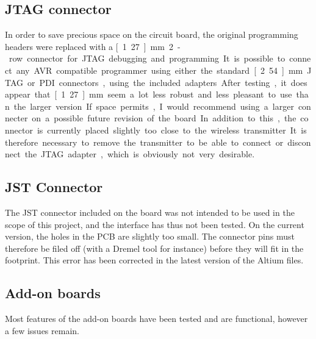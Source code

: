 \subsection{JTAG connector}
In order to save precious space on the circuit board, the original programming
headers were replaced with a \unit[1.27]{mm} 2-row connector for JTAG debugging
and programming. It is possible to connect any AVR compatible programmer using
either the standard \unit[2.54]{mm} JTAG or PDI connectors, using the included
adapters.

After testing, it does appear that \unit[1.27]{mm} seem a lot less robust and
less pleasant to use than the larger version. If space permits, I would
recommend using a larger connecter on a possible future revision of the board.

In addition to this, the connector is currently placed slightly too close to the
wireless transmitter. It is therefore necessary to remove the transmitter to be
able to connect or disconnect the JTAG adapter, which is obviously not very
desirable.

\subsection{JST Connector}
The JST connector included on the board was not intended to be used in the scope
of this project, and the interface has thus not been tested. On the current
version, the holes in the PCB are slightly too small. The connector pins must
therefore be filed off (with a Dremel tool for instance) before they will fit in
the footprint. This error has been corrected in the latest version of the Altium
files.

\subsection{Add-on boards}
\label{sub:problems-sensors}
Most features of the add-on boards have been tested and are functional, however
a few issues remain.

